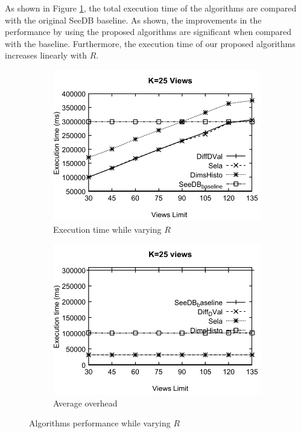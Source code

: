 As shown in Figure \ref{fig:fig33}, the total execution time of the algorithms are compared with the original SeeDB baseline. 
%
%
As shown, the improvements in the performance by using the proposed algorithms are significant when compared with the baseline. 
%
Furthermore, the execution time of our proposed algorithms increases linearly with $R$.
%
\begin{figure}[t]
   \centering
  \begin{subfigure}[b]{0.42\textwidth}
    \includegraphics[width=\textwidth]{33.pdf}
    \caption{Execution time while varying $R$}
    \label{fig:fig33}
  \end{subfigure}
  \begin{subfigure}[b]{0.42\textwidth}
    \includegraphics[width=\textwidth]{34.pdf}
    \caption{Average overhead}
    \label{fig:fig34}
  \end{subfigure}
  \caption{Algorithms performance while varying $R$}
\end{figure}

